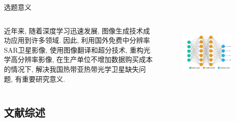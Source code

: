 \begin{frame}{选题意义}
    \begin{columns}
        近年来, 随着深度学习迅速发展, 图像生成技术成功应用到许多领域. 因此, 利用国外免费中分辨率SAR卫星影像, 使用图像翻译和超分技术, 重构光学高分辨率影像, 在生产单位不增加数据购买成本的情况下, 解决我国热带亚热带光学卫星缺失问题, 有重要研究意义.
        
        \begin{figure}
            \centering
            \includegraphics[width=\textwidth]{pic/chap0103.jpg}
            \label{fig:0103}
        \end{figure}
    \end{columns}
    


\end{frame}

\subsection{文献综述}

